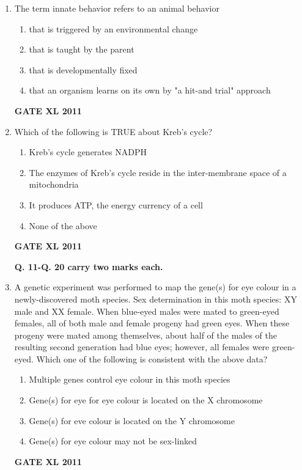 \documentclass[journal,12pt,onecolumn]{IEEEtran}
\begin{document}
\begin{enumerate}
\item{ The term innate behavior refers to an animal behavior}
		\begin{enumerate}
			\item that is triggered by an environmental change
			\item that is taught by the parent
			\item that is developmentally fixed
			\item that an organism learns on its own by "a hit-and trial" approach
		\end{enumerate}
		\hfill{\textbf{GATE XL 2011}}
\item{ Which of the following is TRUE about Kreb's cycle?}
		\begin{enumerate}
			\item Kreb's cycle generates NADPH
			\item The enzymes of Kreb's cycle reside in the inter-membrane space of a mitochondria
			\item It produces ATP, the energy currency of a cell
			\item None of the above
		\end{enumerate}
		\hfill{\textbf{GATE XL 2011}}
\begin{center}
\textbf{Q. 11-Q. 20 carry two marks each.}
\end{center}
\item{ A genetic experiment was performed to map the gene(s) for eye colour in a newly-discovered moth species. Sex determination in this moth species: XY male and XX female. When blue-eyed males were mated to green-eyed females, all of both male and female progeny had green eyes. When these progeny were mated among themselves, about half of the males of the resulting second generation had blue eyes; however, all females were green-eyed. Which one of the following is consistent with the above data?}
		\begin{enumerate}
			\item Multiple genes control eye colour in this moth species
			\item Gene(s) for eye for eye colour is located on the X chromosome
			\item Gene(s) for eve colour is located on the Y chromosome
			\item Gene(s) for eye colour may not be sex-linked
		\end{enumerate}
		\hfill{\textbf{GATE XL 2011}}


\end{enumerate}
\end{document}
